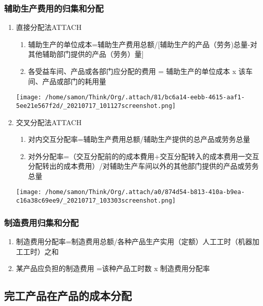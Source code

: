 \documentclass[11pt]{article}
\begin{document}
\subsubsection{辅助生产费用的归集和分配}
\label{sec:orgc406960}
\begin{enumerate}
\item 直接分配法\hfill{}\textsc{ATTACH}
\label{sec:orgbb92843}
\begin{enumerate}
\item 辅助生产的单位成本=辅助生产费用总额/[辅助生产的产品（劳务)总量-对其他辅助部门提供的产品（劳务）量]
\item 各受益车间、产品或各部门应分配的费用 = 辅助生产的单位成本 x 该车间、产品或部门的耗用量
\end{enumerate}
\begin{center}
\texttt{[image: /home/samon/Think/Org/.attach/81/bc6a14-eebb-4615-aaf1-5ee21e567f2d/\_20210717\_101127screenshot.png]}
\end{center}
\item 交叉分配法\hfill{}\textsc{ATTACH}
\label{sec:orgb54e865}
\begin{enumerate}
\item 对内交互分配率=辅助生产费用总额/辅助生产提供的总产品或劳务总量
\item 对外分配率=（交互分配前的的成本費用+交互分配转入的成本费用一交互分配转出的成本费用）/对辅助生产车间以外的其他部门提供的产品或劳务总量
\end{enumerate}
\begin{center}
\texttt{[image: /home/samon/Think/Org/.attach/a0/874d54-b813-410a-b9ea-c16a38c69ee9/\_20210717\_103303screenshot.png]}
\end{center}
\end{enumerate}
\subsubsection{制造费用归集和分配}
\label{sec:org03c09f3}
\begin{enumerate}
\item 制造费用分配率=制造费用总额/各种产品生产实用（定额）人工工时（机器加工工时）之和
\item 某产品应负担的制造费用 =该种产品工时数 x 制造费用分配率
\end{enumerate}
\subsection{完工产品在产品的成本分配}
\label{sec:orgc86b674}
\end{document}
